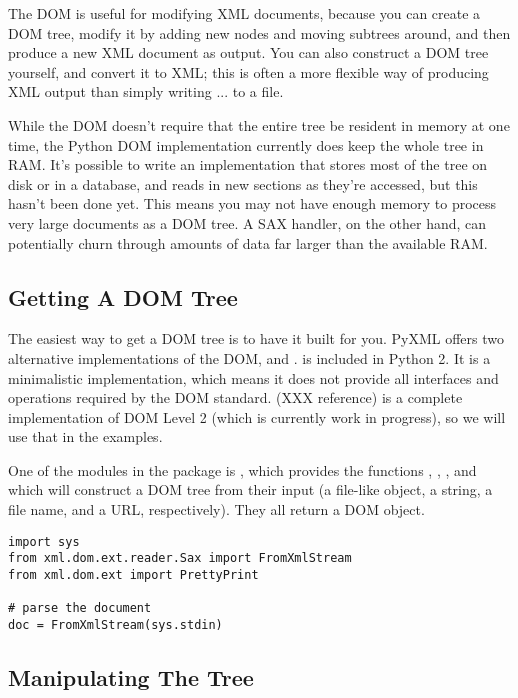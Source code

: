\documentclass{howto}
\begin{document}
The DOM is useful for modifying XML documents, because you can create
a DOM tree, modify it by adding new nodes and moving subtrees around,
and then produce a new XML document as output.  You can also construct
a DOM tree yourself, and convert it to XML; this is often a more
flexible way of producing XML output than simply writing
... to a file.

While the DOM doesn't require that the entire tree be resident in
memory at one time, the Python DOM implementation currently does keep
the whole tree in RAM.  It's possible to write an implementation that
stores most of the tree on disk or in a database, and reads in new
sections as they're accessed, but this hasn't been done yet.
This means you may not have enough memory to process very large
documents as a DOM tree.  A SAX handler, on the other hand, can
potentially churn through amounts of data far larger than the
available RAM.

\subsection{Getting A DOM Tree}

The easiest way to get a DOM tree is to have it built for you. PyXML
offers two alternative implementations of the DOM,
 and .  is
included in Python 2. It is a minimalistic implementation, which means
it does not provide all interfaces and operations required by the DOM
standard.  (XXX reference) is a complete implementation of
DOM Level 2 (which is currently work in progress), so we will use that
in the examples.

One of the modules in the  package is
, which provides the functions
, , ,
and  which will construct a DOM tree from their
input (a file-like object, a string, a file name, and a URL,
respectively). They all return a DOM  object.

\begin{verbatim}
import sys
from xml.dom.ext.reader.Sax import FromXmlStream
from xml.dom.ext import PrettyPrint

# parse the document
doc = FromXmlStream(sys.stdin)
\end{verbatim}

\subsection{Manipulating The Tree}
\end{document}
